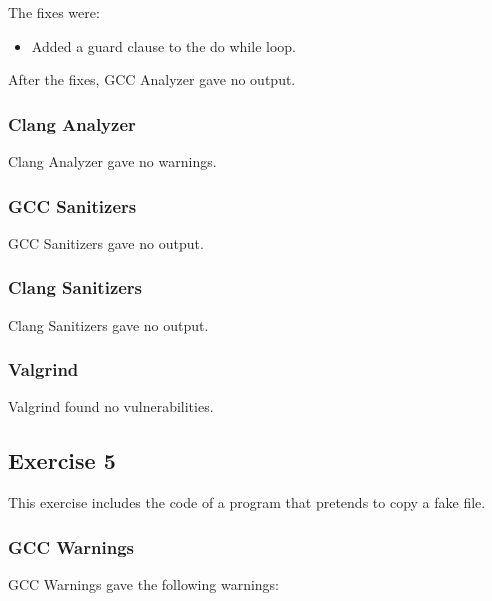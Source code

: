 \documentclass{article}
\begin{document}
The fixes were:

\begin{itemize}
    \item Added a guard clause to the do while loop.
\end{itemize}

After the fixes, GCC Analyzer gave no output.

\subsubsection{Clang Analyzer}

Clang Analyzer gave no warnings.

\subsubsection{GCC Sanitizers}

GCC Sanitizers gave no output.

\subsubsection{Clang Sanitizers}

Clang Sanitizers gave no output.

\subsubsection{Valgrind}

Valgrind found no vulnerabilities.

\subsection{Exercise 5}

This exercise includes the code of a program that pretends to copy a fake file.

\subsubsection{GCC Warnings}

GCC Warnings gave the following warnings:
\end{document}
